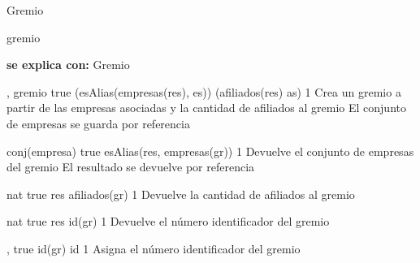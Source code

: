 \begin{interfaz}{Gremio}

\begin{iparamformales}{gremio}

\textbf{\large se explica con:} Gremio

\end{iparamformales}

{, }{gremio}
{true}
{(esAlias(empresas(res), es)) \land (afiliados(res) \igobs as)}
{1}
{Crea un gremio a partir de las empresas asociadas y la cantidad de afiliados al gremio}
{El conjunto de empresas se guarda por referencia}

{}{conj(empresa)}
{true}
{esAlias(res, empresas(gr))}
{1}
{Devuelve el conjunto de empresas del gremio}
{El resultado se devuelve por referencia}

{}{nat}
{true}
{res \igobs afiliados(gr)}
{1}
{Devuelve la cantidad de afiliados al gremio}
{}

{}{nat}
{true}
{res \igobs id(gr)}
{1}
{Devuelve el número identificador del gremio}
{}

{, }{}
{true}
{id(gr) \igobs id}
{1}
{Asigna el número identificador del gremio}
{}

\end{interfaz}